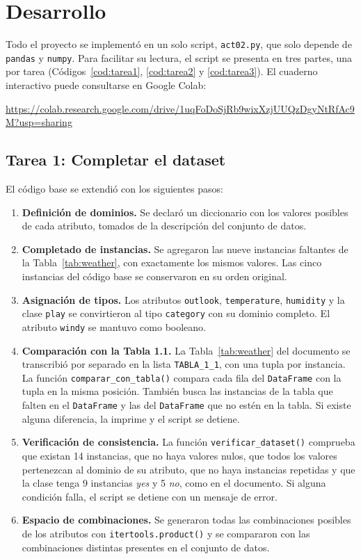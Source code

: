 \documentclass[11pt,letterpaper]{article}
\begin{document}
\section{Desarrollo}

Todo el proyecto se implementó en un solo script, \texttt{act02.py}, que solo depende de \texttt{pandas} y \texttt{numpy}. Para facilitar su lectura, el script se presenta en tres partes, una por tarea (Códigos~\ref{cod:tarea1}, \ref{cod:tarea2} y \ref{cod:tarea3}). El cuaderno interactivo puede consultarse en Google Colab:

\begin{center}
    \url{https://colab.research.google.com/drive/1uqFoDoSjRb9wixXzjUUQzDgyNtRfAc9M?usp=sharing}
\end{center}

\subsection{Tarea 1: Completar el dataset}

El código base se extendió con los siguientes pasos:

\begin{enumerate}
    \item \textbf{Definición de dominios.} Se declaró un diccionario con los valores posibles de cada atributo, tomados de la descripción del conjunto de datos.
    \item \textbf{Completado de instancias.} Se agregaron las nueve instancias faltantes de la Tabla~\ref{tab:weather}, con exactamente los mismos valores. Las cinco instancias del código base se conservaron en su orden original.
    \item \textbf{Asignación de tipos.} Los atributos \texttt{outlook}, \texttt{temperature}, \texttt{humidity} y la clase \texttt{play} se convirtieron al tipo \texttt{category} con su dominio completo. El atributo \texttt{windy} se mantuvo como booleano.
    \item \textbf{Comparación con la Tabla 1.1.} La Tabla~\ref{tab:weather} del documento se transcribió por separado en la lista \texttt{TABLA\_1\_1}, con una tupla por instancia. La función \texttt{comparar\_con\_tabla()} compara cada fila del \texttt{DataFrame} con la tupla en la misma posición. También busca las instancias de la tabla que falten en el \texttt{DataFrame} y las del \texttt{DataFrame} que no estén en la tabla. Si existe alguna diferencia, la imprime y el script se detiene.
    \item \textbf{Verificación de consistencia.} La función \texttt{verificar\_dataset()} comprueba que existan 14 instancias, que no haya valores nulos, que todos los valores pertenezcan al dominio de su atributo, que no haya instancias repetidas y que la clase tenga 9 instancias \textit{yes} y 5 \textit{no}, como en el documento. Si alguna condición falla, el script se detiene con un mensaje de error.
    \item \textbf{Espacio de combinaciones.} Se generaron todas las combinaciones posibles de los atributos con \texttt{itertools.product()} y se compararon con las combinaciones distintas presentes en el conjunto de datos.
\end{enumerate}
\end{document}
